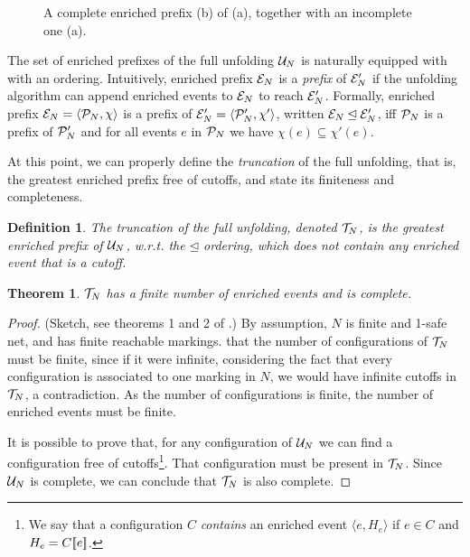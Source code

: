 \documentclass[11pt,a4paper]{article}
\newtheorem{definition}{Definition}
\newtheorem{theorem}{Theorem}
\begin{document}
\begin{figure}
\caption{A complete enriched prefix (b) of  (a), together with an
incomplete one (a).}
\label{fig:a.complete}
\end{figure}

The set of enriched prefixes of the full unfolding $\mathcal{U}_{N}$ is naturally
equipped with with an ordering.  Intuitively, enriched prefix $\mathcal{E}_{N}$ is a
\emph{prefix} of $\mathcal{E}_{N}'$ if the unfolding algorithm can append enriched
events to $\mathcal{E}_{N}$ to reach $\mathcal{E}_{N}'$.  Formally, enriched prefix $\mathcal{E}_{N} =
\langle \mathcal{P}_{N}, \chi \rangle$ is a prefix of $\mathcal{E}_{N}' = \langle \mathcal{P}_{N}',
\chi' \rangle$, written $\mathcal{E}_{N} \unlhd \mathcal{E}_{N}'$, iff $\mathcal{P}_{N}$ is a prefix of
$\mathcal{P}_{N}'$ and for all events $e$ in $\mathcal{P}_{N}$  we have $\chi (e) \subseteq
\chi' (e)$.

At this point, we can properly define the \emph{truncation} of the full
unfolding, that is, the greatest enriched prefix free of cutoffs, and state its
finiteness and completeness.

\begin{definition}
The \emph{truncation} of the full unfolding, denoted $\mathcal{T}_{N}$, is the
greatest enriched prefix of $\mathcal{U}_{N}$, w.r.t. the $\unlhd$ ordering, which does
not contain any enriched event that is a cutoff.
\end{definition}

\begin{theorem}
$\mathcal{T}_{N}$ has a finite number of enriched events and is complete.
\end{theorem}

\begin{proof} (Sketch, see theorems 1 and 2 of .)
By assumption, $N$ is finite and 1-safe net, and has finite reachable markings.
 that the number of configurations of $\mathcal{T}_{N}$ must be finite,
since if it were infinite, considering the fact that every configuration is
associated to one marking in $N$, we would have infinite cutoffs in $\mathcal{T}_{N}$,
a contradiction.  As the number of configurations is finite, the number of
enriched events must be finite.

It is possible to prove that, for any configuration of $\mathcal{U}_{N}$ we can find a
configuration free of cutoffs\footnote{We say that a configuration $C$
\emph{contains} an enriched event $\langle e, H_e \rangle$ if $e \in C$ and
$H_e = C [\![ e]\!]$.}.  That configuration must be present in $\mathcal{T}_{N}$.  Since
$\mathcal{U}_{N}$ is complete, we can conclude that $\mathcal{T}_{N}$ is also complete.
\end{proof}
\end{document}

